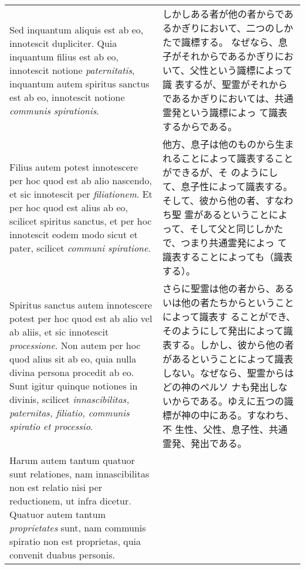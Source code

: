 \documentclass[10pt]{jsarticle} %
\begin{document}
\begin{longtable}{p{21em}p{21em}}
\\



Sed inquantum aliquis est ab eo, innotescit
dupliciter. Quia inquantum filius est ab eo, innotescit notione
{\itshape paternitatis}, inquantum autem spiritus sanctus est ab eo, innotescit
notione {\itshape communis spirationis}. 

&

しかしある者が他の者からであるかぎりにおいて、二つのしかたで識標する。
なぜなら、息子がそれからであるかぎりにおいて、父性という識標によって識
表するが、聖霊がそれからであるかぎりにおいては、共通霊発という識標によっ
て識表するからである。

\\


Filius autem potest innotescere per hoc
quod est ab alio nascendo, et sic innotescit per {\itshape filiationem}. Et per
hoc quod est alius ab eo, scilicet spiritus sanctus, et per hoc
innotescit eodem modo sicut et pater, scilicet {\itshape communi
spiratione}. 



&

他方、息子は他のものから生まれることによって識表することができるが、そ
のようにして、息子性によって識表する。そして、彼から他の者、すなわち聖
霊があるということによって、そして父と同じしかたで、つまり共通霊発によっ
て識表することによっても（識表する）。


\\



Spiritus sanctus autem innotescere potest per hoc quod est
ab alio vel ab aliis, et sic innotescit {\itshape processione}. Non autem per hoc
quod alius sit ab eo, quia nulla divina persona procedit ab eo. Sunt
igitur quinque notiones in divinis, scilicet {\itshape innascibilitas,
paternitas, filiatio, communis spiratio et processio}. 


&

さらに聖霊は他の者から、あるいは他の者たちからということによって識表す
ることができ、そのようにして発出によって識表する。しかし、彼から他の者
があるということによって識表しない。なぜなら、聖霊からはどの神のペルソ
ナも発出しないからである。ゆえに五つの識標が神の中にある。すなわち、不
生性、父性、息子性、共通霊発、発出である。

\\



Harum autem
tantum quatuor sunt relationes, nam innascibilitas non est relatio
nisi per reductionem, ut infra dicetur. Quatuor autem tantum
{\itshape proprietates} sunt, nam communis spiratio non est proprietas, quia
convenit duabus personis. 



\end{longtable}
\end{document}
